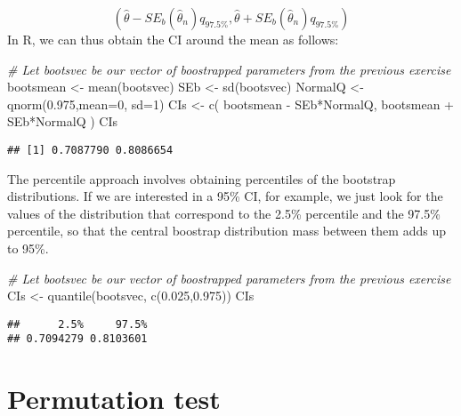 \documentclass[
]{book}
\newenvironment{Shaded}{\begin{snugshade}}{\end{snugshade}}
\newcommand{\AttributeTok}[1]{\textcolor[rgb]{0.77,0.63,0.00}{#1}}
\newcommand{\CommentTok}[1]{\textcolor[rgb]{0.56,0.35,0.01}{\textit{#1}}}
\newcommand{\DecValTok}[1]{\textcolor[rgb]{0.00,0.00,0.81}{#1}}
\newcommand{\FloatTok}[1]{\textcolor[rgb]{0.00,0.00,0.81}{#1}}
\newcommand{\FunctionTok}[1]{\textcolor[rgb]{0.00,0.00,0.00}{#1}}
\newcommand{\NormalTok}[1]{#1}
\newcommand{\OtherTok}[1]{\textcolor[rgb]{0.56,0.35,0.01}{#1}}
\newcommand{\SpecialCharTok}[1]{\textcolor[rgb]{0.00,0.00,0.00}{#1}}
\begin{document}
\[(\hat{\theta} - SE_b(\hat{\theta}_n)q_{97.5\%}, \hat{\theta} + SE_b(\hat{\theta}_n)q_{97.5\%})\]
In R, we can thus obtain the CI around the mean as follows:

\begin{Shaded}
\begin{Highlighting}[]
\CommentTok{\# Let bootsvec be our vector of boostrapped parameters from the previous exercise}
\NormalTok{bootsmean }\OtherTok{\textless{}{-}} \FunctionTok{mean}\NormalTok{(bootsvec)}
\NormalTok{SEb }\OtherTok{\textless{}{-}} \FunctionTok{sd}\NormalTok{(bootsvec)}
\NormalTok{NormalQ }\OtherTok{\textless{}{-}} \FunctionTok{qnorm}\NormalTok{(}\FloatTok{0.975}\NormalTok{,}\AttributeTok{mean=}\DecValTok{0}\NormalTok{, }\AttributeTok{sd=}\DecValTok{1}\NormalTok{)}
\NormalTok{CIs }\OtherTok{\textless{}{-}} \FunctionTok{c}\NormalTok{( bootsmean }\SpecialCharTok{{-}}\NormalTok{ SEb}\SpecialCharTok{*}\NormalTok{NormalQ, bootsmean }\SpecialCharTok{+}\NormalTok{ SEb}\SpecialCharTok{*}\NormalTok{NormalQ )}
\NormalTok{CIs}
\end{Highlighting}
\end{Shaded}

\begin{verbatim}
## [1] 0.7087790 0.8086654
\end{verbatim}

The percentile approach involves obtaining percentiles of the bootstrap distributions. If we are interested in a 95\% CI, for example, we just look for the values of the distribution that correspond to the 2.5\% percentile and the 97.5\% percentile, so that the central boostrap distribution mass between them adds up to 95\%.

\begin{Shaded}
\begin{Highlighting}[]
\CommentTok{\# Let bootsvec be our vector of boostrapped parameters from the previous exercise}
\NormalTok{CIs }\OtherTok{\textless{}{-}} \FunctionTok{quantile}\NormalTok{(bootsvec, }\FunctionTok{c}\NormalTok{(}\FloatTok{0.025}\NormalTok{,}\FloatTok{0.975}\NormalTok{))}
\NormalTok{CIs}
\end{Highlighting}
\end{Shaded}

\begin{verbatim}
##      2.5%     97.5% 
## 0.7094279 0.8103601
\end{verbatim}

\hypertarget{permutation-test}{%
\section{Permutation test}\label{permutation-test}}
\end{document}
